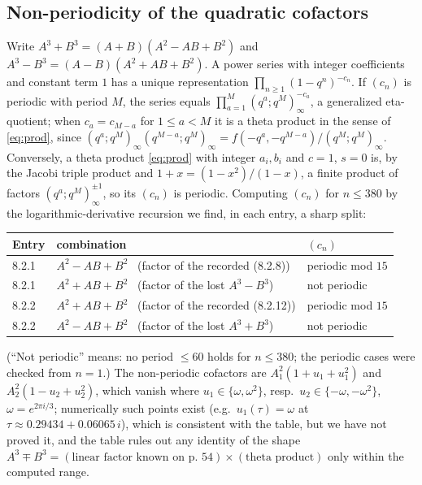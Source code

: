 \documentclass[pdflatex,sn-mathphys-num]{sn-jnl}
\theoremstyle{thmstyleone}%
\theoremstyle{thmstyletwo}%
\newcommand{\f}{f}
\begin{document}
\subsection{Non-periodicity of the quadratic cofactors}
Write $A^3+B^3=(A+B)(A^2-AB+B^2)$ and $A^3-B^3=(A-B)(A^2+AB+B^2)$. A power
series with integer coefficients and constant term $1$ has a unique
representation $\prod_{n\ge1}(1-q^n)^{-c_n}$. If $(c_n)$ is periodic with
period $M$, the series equals $\prod_{a=1}^{M}(q^a;q^M)_\infty^{-c_a}$, a
generalized eta-quotient; when $c_a=c_{M-a}$ for $1\le a<M$ it is a theta product in the sense of
\eqref{eq:prod}, since $(q^a;q^M)_\infty(q^{M-a};q^M)_\infty=\f(-q^a,-q^{M-a})/(q^M;q^M)_\infty$.
Conversely, a theta product \eqref{eq:prod} with integer $a_i,b_i$ and $c=1$, $s=0$ is, by the Jacobi
triple product and $1+x=(1-x^2)/(1-x)$, a finite product of factors $(q^a;q^M)_\infty^{\pm1}$, so its
$(c_n)$ is periodic. Computing $(c_n)$ for $n\le 380$
by the logarithmic-derivative recursion we find, in each entry, a sharp split:
\begin{center}
\begin{tabular}{lll}
\toprule
Entry & combination & $(c_n)$\\
\midrule
8.2.1 & $A^2-AB+B^2$ \ (factor of the recorded (8.2.8)) & periodic mod $15$\\
8.2.1 & $A^2+AB+B^2$ \ (factor of the lost $A^3-B^3$) & not periodic\\
8.2.2 & $A^2+AB+B^2$ \ (factor of the recorded (8.2.12)) & periodic mod $15$\\
8.2.2 & $A^2-AB+B^2$ \ (factor of the lost $A^3+B^3$) & not periodic\\
\bottomrule
\end{tabular}
\end{center}
(``Not periodic'' means: no period $\le 60$ holds for $n\le 380$; the periodic cases were checked from $n=1$.) The non-periodic cofactors are $A_1^2(1+u_1+u_1^2)$ and $A_2^2(1-u_2+u_2^2)$, which vanish where $u_1\in\{\omega,\omega^2\}$, resp.\ $u_2\in\{-\omega,-\omega^2\}$, $\omega=e^{2\pi i/3}$; numerically such points exist (e.g.\ $u_1(\tau)=\omega$ at $\tau\approx0.29434+0.06065\,i$), which is consistent with the table, but we have not proved it, and the table rules out any identity of the shape
$A^3\mp B^3=(\text{linear factor known on p.~54})\times(\text{theta product})$ only within the computed range.
\end{document}
